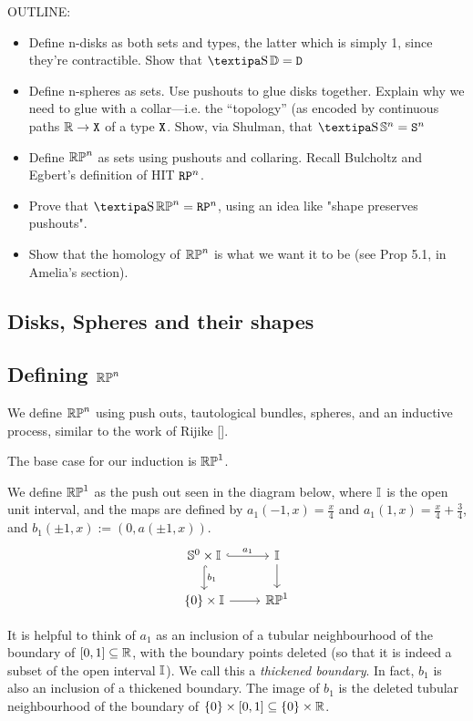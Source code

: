 \documentclass{amsart}
\begin{document}
OUTLINE:
\begin{itemize}
\item
  Define n-disks as both sets and types, the latter which is
  simply 1, since they're contractible. Show that $ \shape
  \DD = \D $ 
\item
  Define n-spheres as sets.  Use pushouts to glue
  disks together. Explain why we need to glue with a
  collar---i.e. the ``topology'' (as encoded by continuous
  paths $ \mathbb{R} \to \mathtt{X} $ of a type $ \mathtt{X} $. Show, via Shulman,
  that $ \shape \SS^n = \S^n $ 
\item
  Define $ \mathbb{RP}^n $ as sets using pushouts and collaring.
  Recall Bulcholtz and Egbert's definition of HIT $ \mathtt{RP}^n
  $. 
 \item
  Prove that $ \shape \set{RP}^n = \RP^n $, using an idea like "shape preserves pushouts".
\item
Show that the homology of $\mathbb{RP}^n$ is what we want it to be (see Prop 5.1, in Amelia's section).
\end{itemize}

\subsection{Disks, Spheres and their shapes}
\subsection{Defining $\mathbb{RP}^n$}
We define $\mathbb{RP}^n$ using push outs, tautological bundles, spheres, and an inductive process, similar to the work of Rijike [].

The base case for our induction is $\mathbb{RP}^1$.

\begin{definition}
We define $\mathbb{RP}^1$ as the push out seen in the diagram below, where $\mathbb{I}$ is the open unit interval, and the maps are defined by $a_1(-1,x) = \frac{x}{4}$ and $a_1(1,x)= \frac{x}{4} + \frac{3}{4}$, and $b_1 (\pm 1, x) := (0, a(\pm1, x))$.\\
\[\begin{tikzcd}
\set{S}^0 \times \set{I} \arrow[r, hook, "a_1"] \arrow[d, hook, "b_1" ] & \set{I} \arrow[d]\\
\{0 \} \times \set{I} \arrow[r] & \set{RP}^1
\end{tikzcd}
\]
\end{definition}

It is helpful to think of $a_1$ as an inclusion of a tubular neighbourhood of the boundary of $[0,1] \subseteq \mathbb{R}$, with the boundary points deleted (so that it is indeed a subset of the open interval $\mathbb{I}$). We call this a \emph{thickened boundary}. In fact, $b_1$ is also an inclusion of a thickened boundary. The image of $b_1$ is the deleted tubular neighbourhood of the boundary of $\{0\} \times [0,1] \subseteq \{0\} \times \mathbb{R}$.
\end{document}
